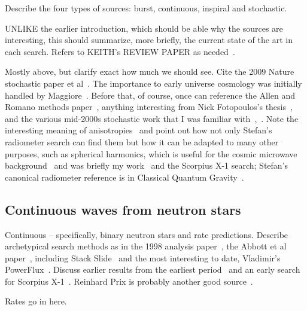             Describe the four types of sources: burst, continuous, inspiral and stochastic.

            UNLIKE the earlier introduction, which should be able why the sources are interesting, this should summarize, more briefly, the current state of the art in each search. Refers to KEITH's REVIEW PAPER as needed~\cite{Riles2013}.

		Mostly above, but clarify exact how much we should see. Cite the 2009 Nature stochastic paper et al~\cite{LIGOStochasticNature2009}. The importance to early universe cosmology was initially handled by Maggiore~\cite{Maggiore2000}. Before that, of course, once can reference the Allen and Romano methods paper~\cite{Allen1999}, anything interesting from Nick Fotopoulos's thesis~\cite{FotopoulosThesis}, and the various mid-2000s stochastic work that I was familiar with~\cite{Abbott2006},~\cite{Abbott2007}. Note the interesting meaning of anisotropies~\cite{Allen1997} and point out how not only Stefan's radiometer search can find them but how it can be adapted to many other purposes, such as spherical harmonics, which is useful for the cosmic microwave background~\cite{Muciaccia1997} and was briefly my work~\cite{MeadorsCaltech2007} and the Scorpius X-1 search; Stefan's canonical radiometer reference is in Classical Quantum Gravity~\cite{Radiometer2006}.

        \subsection{Continuous waves from neutron stars}
        \label{continuous_waves}

            Continuous -- specifically, binary neutron stars and rate predictions. Describe archetypical search methods as in the 1998 analysis paper~\cite{Jaranowski1998}, the Abbott et al paper~\cite{LSCPulsar2006}, including Stack Slide~\cite{LSCPulsarS4} and the most interesting to date, Vladimir's PowerFlux~\cite{LSCPowerFlux2009}. Discuss earlier results from the earliest period~\cite{Abbott2004} and an early search for Scorpius X-1~\cite{AbbottPulsar2006}. Reinhard Prix is probably another good source~\cite{Prix2006}.

		Rates go in here.

